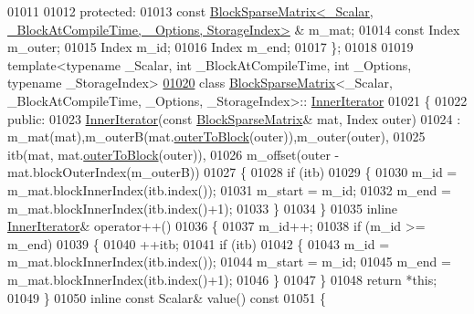 \begin{DoxyCode}
01011 
01012   \textcolor{keyword}{protected}:
01013     \textcolor{keyword}{const} 
      \hyperlink{group___sparse_core___module}{BlockSparseMatrix<\_Scalar, \_BlockAtCompileTime, \_Options, StorageIndex>}
      & m\_mat;
01014     \textcolor{keyword}{const} Index m\_outer;
01015     Index m\_id;
01016     Index m\_end;
01017 \};
01018 
01019 \textcolor{keyword}{template}<\textcolor{keyword}{typename} \_Scalar, \textcolor{keywordtype}{int} \_BlockAtCompileTime, \textcolor{keywordtype}{int} \_Options, \textcolor{keyword}{typename} \_StorageIndex>
\hyperlink{class_eigen_1_1_block_sparse_matrix_1_1_inner_iterator}{01020} \textcolor{keyword}{class }\hyperlink{group___sparse_core___module_class_eigen_1_1_block_sparse_matrix}{BlockSparseMatrix}<\_Scalar, \_BlockAtCompileTime, \_Options, \_StorageIndex>::
      \hyperlink{class_eigen_1_1_block_sparse_matrix_1_1_inner_iterator}{InnerIterator}
01021 \{
01022   \textcolor{keyword}{public}:
01023     \hyperlink{class_eigen_1_1_block_sparse_matrix_1_1_inner_iterator}{InnerIterator}(\textcolor{keyword}{const} \hyperlink{group___sparse_core___module_class_eigen_1_1_block_sparse_matrix}{BlockSparseMatrix}& mat, Index outer)
01024     : m\_mat(mat),m\_outerB(mat.\hyperlink{group___sparse_core___module_a9f83554f7b1309ac7ad88d19ef8d6339}{outerToBlock}(outer)),m\_outer(outer),
01025       itb(mat, mat.\hyperlink{group___sparse_core___module_a9f83554f7b1309ac7ad88d19ef8d6339}{outerToBlock}(outer)),
01026       m\_offset(outer - mat.blockOuterIndex(m\_outerB))
01027      \{
01028         \textcolor{keywordflow}{if} (itb)
01029         \{
01030           m\_id = m\_mat.blockInnerIndex(itb.index());
01031           m\_start = m\_id;
01032           m\_end = m\_mat.blockInnerIndex(itb.index()+1);
01033         \}
01034      \}
01035     \textcolor{keyword}{inline} \hyperlink{class_eigen_1_1_block_sparse_matrix_1_1_inner_iterator}{InnerIterator}& operator++()
01036     \{
01037       m\_id++;
01038       \textcolor{keywordflow}{if} (m\_id >= m\_end)
01039       \{
01040         ++itb;
01041         \textcolor{keywordflow}{if} (itb)
01042         \{
01043           m\_id = m\_mat.blockInnerIndex(itb.index());
01044           m\_start = m\_id;
01045           m\_end = m\_mat.blockInnerIndex(itb.index()+1);
01046         \}
01047       \}
01048       \textcolor{keywordflow}{return} *\textcolor{keyword}{this};
01049     \}
01050     \textcolor{keyword}{inline} \textcolor{keyword}{const} Scalar& value()\textcolor{keyword}{ const}
01051 \textcolor{keyword}{    }\{

\end{DoxyCode}
